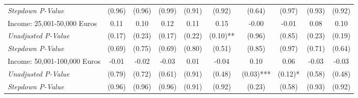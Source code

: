 \begin{tabular}{l c c c c c c c c c}
\quad \textit{Stepdown P-Value} & (0.96) & (0.96) & (0.99) & (0.91) & (0.92) & (0.64) & (0.97) & (0.93) & (0.92) \\
Income: 25,001-50,000 Euros & 0.11 & 0.10 & 0.12 & 0.11 & 0.15 & -0.00 & -0.01 & 0.08 & 0.10 \\
\quad \textit{Unadjusted P-Value} & (0.17) & (0.23) & (0.17) & (0.22) & (0.10)** & (0.96) & (0.85) & (0.23) & (0.19) \\
\quad \textit{Stepdown P-Value} & (0.69) & (0.75) & (0.69) & (0.80) & (0.51) & (0.85) & (0.97) & (0.71) & (0.64) \\
Income: 50,001-100,000 Euros & -0.01 & -0.02 & -0.03 & 0.01 & -0.04 & 0.10 & 0.06 & -0.03 & -0.03 \\
\quad \textit{Unadjusted P-Value} & (0.79) & (0.72) & (0.61) & (0.91) & (0.48) & (0.03)*** & (0.12)* & (0.58) & (0.48) \\
\quad \textit{Stepdown P-Value} & (0.96) & (0.96) & (0.96) & (0.91) & (0.92) & (0.23) & (0.58) & (0.93) & (0.92) \\
\bottomrule
\end{tabular}
